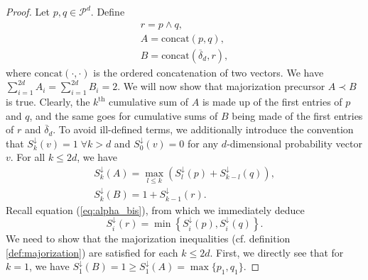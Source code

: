 \begin{proof}
    Let $p, q \in \mathcal{P}^d$. Define 
    \begin{gather}
        r = p \wedge q,\\
        A = \text{concat}(p, q),\\
        B = \text{concat}(\overline{\delta}_d, r),
    \end{gather}
    where $\text{concat}(\cdot, \cdot)$ is the ordered concatenation of two vectors. We have $\sum_{i=1}^{2d} A_i = \sum_{i=1}^{2d} B_i = 2$. We will now show that majorization precursor $A \prec B$ is true. Clearly, the $k^{\text{th}}$ cumulative sum of $A$ is made up of the first entries of $p$ and $q$, and the same goes for cumulative sums of $B$ being made of the first entries of $r$ and $\overline{\delta}_d$. To avoid ill-defined terms, we additionally introduce the convention that $S^\downarrow_k (v) = 1 \; \forall k > d$ and $S^\downarrow_0(v) = 0$ for any $d$-dimensional probability vector $v$. For all $k \leq 2d$, we have
    \begin{gather}
        S^\downarrow_k (A) = \max_{l\leq k} \left(S^\downarrow_l (p) + S^\downarrow_{k-l} (q)\right), \\
        S^\downarrow_k (B) = 1 + S^\downarrow_{k-1}(r).
    \end{gather} %
    Recall equation (\ref{eq:alpha_bis}), from which we immediately deduce
    \begin{equation}
        S^\downarrow_i (r) = \min \left\{S^\downarrow_i (p), S^\downarrow_i (q)\right\}.
    \end{equation}
    We need to show that the majorization inequalities (cf. definition \ref{def:majorization}) are satisfied for each $k \leq 2d$. First, we directly see that for $k = 1$, we have $S^\downarrow_1(B) = 1 \geq S^\downarrow_1(A) = \max \{p_1, q_1\}$. 
    

\end{proof}
